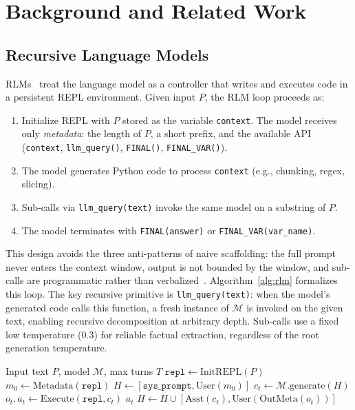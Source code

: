 \documentclass{article}
\begin{document}
\section{Background and Related Work}
\label{sec:background}

\subsection{Recursive Language Models}

RLMs~\cite{zhang2026rlm} treat the language model as a controller that writes and executes code in a persistent REPL environment. Given input $P$, the RLM loop proceeds as:
\begin{enumerate}
    \item Initialize REPL with $P$ stored as the variable \texttt{context}. The model receives only \emph{metadata}: the length of $P$, a short prefix, and the available API (\texttt{context}, \texttt{llm\_query()}, \texttt{FINAL()}, \texttt{FINAL\_VAR()}).
    \item The model generates Python code to process \texttt{context} (e.g., chunking, regex, slicing).
    \item Sub-calls via \texttt{llm\_query(text)} invoke the same model on a substring of $P$.
    \item The model terminates with \texttt{FINAL(answer)} or \texttt{FINAL\_VAR(var\_name)}.
\end{enumerate}

This design avoids the three anti-patterns of naive scaffolding: the full prompt never enters the context window, output is not bounded by the window, and sub-calls are programmatic rather than verbalized~\cite{zhang2026rlm}. Algorithm~\ref{alg:rlm} formalizes this loop. The key recursive primitive is \texttt{llm\_query(text)}: when the model's generated code calls this function, a fresh instance of $\mathcal{M}$ is invoked on the given text, enabling recursive decomposition at arbitrary depth. Sub-calls use a fixed low temperature (0.3) for reliable factual extraction, regardless of the root generation temperature.

\begin{algorithm}[t]
\caption{RLM Inference Loop}
\label{alg:rlm}
\begin{algorithmic}[1]
\REQUIRE Input text $P$, model $\mathcal{M}$, max turns $T$
\STATE $\texttt{repl} \leftarrow \text{InitREPL}(P)$ 
\STATE $m_0 \leftarrow \text{Metadata}(\texttt{repl})$ 
\STATE $H \leftarrow [\texttt{sys\_prompt}, \text{User}(m_0)]$
    \STATE $c_t \leftarrow \mathcal{M}.\text{generate}(H)$ 
    \STATE $o_t, a_t \leftarrow \text{Execute}(\texttt{repl}, c_t)$ 
        \RETURN $a_t$ 
    \ENDIF
    \STATE $H \leftarrow H \cup [\text{Asst}(c_t), \text{User}(\text{OutMeta}(o_t))]$
\ENDFOR
\RETURN {}
\end{algorithmic}
\end{algorithm}
\end{document}
